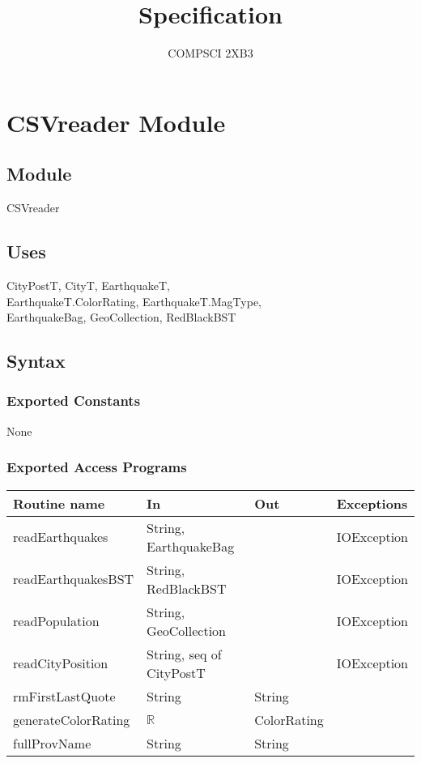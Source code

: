 \documentclass[12pt]{article}
\title{Specification}
\author{COMPSCI 2XB3}
\begin{document}
\newpage

\section* {CSVreader Module}

\subsection* {Module}

CSVreader

\subsection* {Uses}

CityPostT, CityT, EarthquakeT,\\
EarthquakeT.ColorRating, EarthquakeT.MagType,\\
EarthquakeBag, GeoCollection, RedBlackBST

\subsection* {Syntax}

\subsubsection* {Exported Constants}

None

\subsubsection* {Exported Access Programs}

\begin{tabular}{| l | l | l | l |}
\hline
\textbf{Routine name} & \textbf{In} & \textbf{Out} & \textbf{Exceptions}\\
\hline
readEarthquakes & String, EarthquakeBag & ~ & IOException\\
\hline
readEarthquakesBST & String, RedBlackBST & ~ & IOException\\
\hline
readPopulation & String, GeoCollection & ~ & IOException\\
\hline
readCityPosition & String, seq of CityPostT & ~ & IOException\\
\hline
rmFirstLastQuote & String & String & ~\\
\hline
generateColorRating & $\mathbb{R}$ & ColorRating & ~\\
\hline
fullProvName & String & String & ~\\
\hline
\end{tabular}
\end{document}
